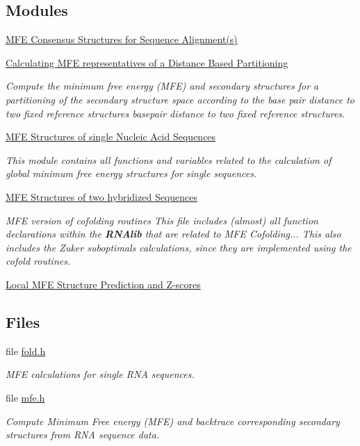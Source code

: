 \subsection*{Modules}
\begin{DoxyCompactItemize}
\item 
\hyperlink{group__consensus__mfe__fold}{M\+F\+E Consensus Structures for Sequence Alignment(s)}
\item 
\hyperlink{group__kl__neighborhood__mfe}{Calculating M\+F\+E representatives of a Distance Based Partitioning}
\begin{DoxyCompactList}\small\item\em Compute the minimum free energy (M\+FE) and secondary structures for a partitioning of the secondary structure space according to the base pair distance to two fixed reference structures basepair distance to two fixed reference structures. \end{DoxyCompactList}\item 
\hyperlink{group__mfe__fold__single}{M\+F\+E Structures of single Nucleic Acid Sequences}
\begin{DoxyCompactList}\small\item\em This module contains all functions and variables related to the calculation of global minimum free energy structures for single sequences. \end{DoxyCompactList}\item 
\hyperlink{group__mfe__cofold}{M\+F\+E Structures of two hybridized Sequences}
\begin{DoxyCompactList}\small\item\em M\+FE version of cofolding routines This file includes (almost) all function declarations within the {\bfseries R\+N\+Alib} that are related to M\+FE Cofolding... This also includes the Zuker suboptimals calculations, since they are implemented using the cofold routines. \end{DoxyCompactList}\item 
\hyperlink{group__local__mfe__fold}{Local M\+F\+E Structure Prediction and Z-\/scores}
\end{DoxyCompactItemize}
\subsection*{Files}
\begin{DoxyCompactItemize}
\item 
file \hyperlink{fold_8h}{fold.\+h}
\begin{DoxyCompactList}\small\item\em M\+FE calculations for single R\+NA sequences. \end{DoxyCompactList}\item 
file \hyperlink{mfe_8h}{mfe.\+h}
\begin{DoxyCompactList}\small\item\em Compute Minimum Free energy (M\+FE) and backtrace corresponding secondary structures from R\+NA sequence data. \end{DoxyCompactList}\end{DoxyCompactItemize}
